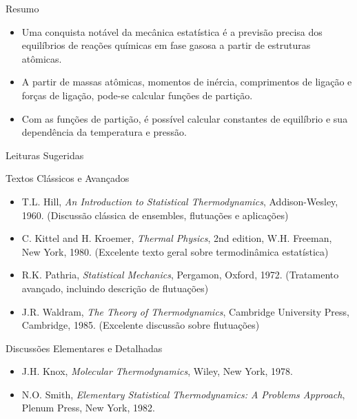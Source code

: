\documentclass{beamer}
\begin{document}
\begin{frame}{Resumo}
    \begin{itemize}
        \item Uma conquista notável da mecânica estatística é a previsão precisa dos equilíbrios de reações químicas em fase gasosa a partir de estruturas atômicas. 
        \item A partir de massas atômicas, momentos de inércia, comprimentos de ligação e forças de ligação, pode-se calcular funções de partição. 
        \item Com as funções de partição, é possível calcular constantes de equilíbrio e sua dependência da temperatura e pressão. 
    \end{itemize}
\end{frame}

\begin{frame}{Leituras Sugeridas}
    \begin{block}{Textos Clássicos e Avançados}
        \begin{itemize}
            \item T.L. Hill, \textit{An Introduction to Statistical Thermodynamics}, Addison-Wesley, 1960. (Discussão clássica de ensembles, flutuações e aplicações) 
            \item C. Kittel and H. Kroemer, \textit{Thermal Physics}, 2nd edition, W.H. Freeman, New York, 1980. (Excelente texto geral sobre termodinâmica estatística) 
            \item R.K. Pathria, \textit{Statistical Mechanics}, Pergamon, Oxford, 1972. (Tratamento avançado, incluindo descrição de flutuações) 
            \item J.R. Waldram, \textit{The Theory of Thermodynamics}, Cambridge University Press, Cambridge, 1985. (Excelente discussão sobre flutuações) 
        \end{itemize}
    \end{block}
    \begin{block}{Discussões Elementares e Detalhadas}
        \begin{itemize}
            \item J.H. Knox, \textit{Molecular Thermodynamics}, Wiley, New York, 1978.
            \item N.O. Smith, \textit{Elementary Statistical Thermodynamics: A Problems Approach}, Plenum Press, New York, 1982.
        \end{itemize}
    \end{block}
\end{frame}

\end{document}
